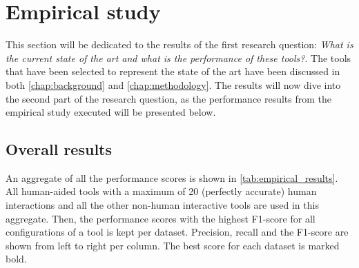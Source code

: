 \section{Empirical study}
This section will be dedicated to the results of the first research question: \textit{What is the current state of the art and what is the performance
of these tools?}. The tools that have been selected to represent the state of the art have been discussed in both \autoref{chap:background} and \autoref{chap:methodology}. The results will now dive into the second part of the research question, as the performance results from the empirical study executed will be presented below. 






\subsection{Overall results}
\label{subsec:empirical_overall_results}
An aggregate of all the performance scores is shown in \autoref{tab:empirical_results}. All human-aided tools with a maximum of 20 (perfectly accurate) human interactions and all the other non-human interactive tools are used in this aggregate. Then, the performance scores with the highest F1-score for all configurations of a tool is kept per dataset. Precision, recall and the F1-score are shown from left to right per column. The best score for each dataset is marked bold.

